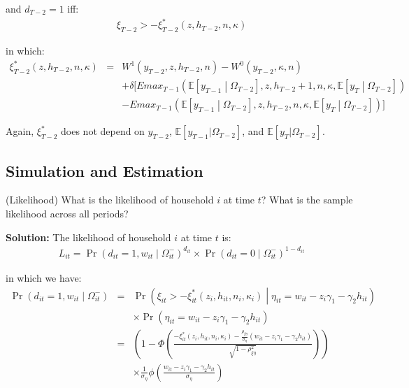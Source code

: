 \noindent and $d_{T-2} = 1$ iff:
\begin{eqnarray*}
\xi_{T-2} > -\xi^*_{T-2} \left(z, h_{T-2}, n, \kappa \right)
\end{eqnarray*}

\noindent in which:
\begin{eqnarray*}
\xi^*_{T-2} \left(z, h_{T-2}, n, \kappa \right) &=& W^1\left(y_{T-2}, z, h_{T-2}, n\right) - W^0\left(y_{T-2},\kappa, n \right)\\
& & + \delta [ Emax_{T-1} \left( \mathbb{E} [y_{T-1} \middle| \Omega_{T-2}], z, h_{T-2}+1, n, \kappa, \mathbb{E} [y_T \middle| \Omega_{T-2}] \right) \\
& & - Emax_{T-1} \left( \mathbb{E} [y_{T-1} \middle| \Omega_{T-2}], z, h_{T-2}, n, \kappa, \mathbb{E} [y_T \middle| \Omega_{T-2}] \right)]
\end{eqnarray*}

\noindent Again, $\xi_{T-2}^*$ does not depend on $y_{T-2}$, $\mathbb{E} [y_{T-1} | \Omega_{T-2}]$, and $\mathbb{E} [y_T | \Omega_{T-2}]$.

\subsection{Simulation and Estimation}

\begin{exercise} (Likelihood)
What is the likelihood of household $i$ at time $t$? What is the sample likelihood across all periods?
\end{exercise}

\noindent\textbf{Solution:} The likelihood of household $i$ at time $t$ is:
\begin{eqnarray*}
L_{it} = \Pr \left(d_{it} = 1, w_{it} \middle| \Omega_{it}^- \right)^{d_{it}} \times \Pr \left(d_{it} = 0 \middle| \Omega_{it}^- \right)^{1-d_{it}}
\end{eqnarray*}

\noindent in which we have:
\begin{eqnarray*}
\Pr\left(d_{it}=1, w_{it} \middle| \Omega_{it}^- \right) &=& \Pr \left( \xi_{it} > -\xi_{it}^* \left(z_i, h_{it}, n_i, \kappa_i \right) \middle| \eta_{it} = w_{it} -z_i \gamma_1 - \gamma_2 h_{it} \right)\\
& & \times \Pr \left( \eta_{it} = w_{it} -z_i \gamma_1 - \gamma_2 h_{it} \right)\\
&=& \left( 1 - \Phi \left(\frac{-\xi_{it}^* \left(z_i, h_{it}, n_i, \kappa_i \right) - \frac{\rho_{\xi \eta}}{\sigma_\eta} \left(w_{it} - z_i \gamma_1 - \gamma_2 h_{it} \right)}{\sqrt{1-\rho_{\xi \eta}^2}} \right) \right) \\
& & \times \frac{1}{\sigma_\eta} \phi \left( \frac{w_{it} - z_i \gamma_1 - \gamma_2 h_{it}}{\sigma_\eta} \right) 
\end{eqnarray*}

